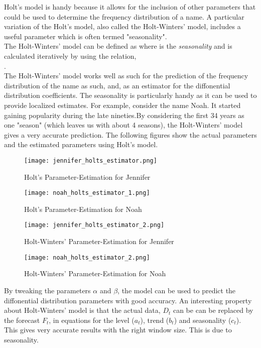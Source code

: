 \documentclass[letterpaper,12pt]{article}
\begin{document}
Holt's model is handy because it allows for the inclusion of other parameters that could be used to determine the frequency distribution of a name. A particular variation of the Holt's model, also called the Holt-Winters' model, includes a useful parameter which is often termed  "seasonality".\\
The Holt-Winters' model can be defined as  where   is the \textit{seasonality} and is calculated iteratively by using the relation,\\ .\\
The Holt-Winters' model works well as such for the prediction of the frequency distribution of the name as such, and, as an estimator for the diffonential distribution coefficients.
The seasonality is particularly handy as it can be used to provide localized estimates. For example, consider the name Noah. It started gaining popularity during the late nineties.By considering the first 34 years as one "season" (which leaves us with about 4 seasons), the Holt-Winters' model gives a very accurate prediction.  
The following figures show the actual parameters and the estimated parameters using Holt's  model. 

\begin{figure}
\texttt{[image: jennifer\_holts\_estimator.png]}
\caption{Holt's Parameter-Estimation for Jennifer}
\end{figure}
\begin{figure}
\texttt{[image: noah\_holts\_estimator\_1.png]}
\caption{Holt's Parameter-Estimation for Noah }

\texttt{[image: jennifer\_holts\_estimator\_2.png]}
\caption{Holt-Winters' Parameter-Estimation for Jennifer }
\end{figure}
\begin{figure}
\texttt{[image: noah\_holts\_estimator\_2.png]}
\caption{Holt-Winters' Parameter-Estimation for Noah}
\end{figure}
By tweaking the parameters $\alpha$ and $\beta$, the model can be used to predict the diffonential distribution parameters with good accuracy. An interesting property about Holt-Winters' model is that the actual data, $D_{t}$ can be can be replaced by the forecast $F_{t}$, in equations for the level ($a_{t}$), trend ($b_{t}$) and seasonality ($c_{t}$). This gives very accurate results with the right window size. This is due to seasonality. 
\pagebreak
\end{document}
